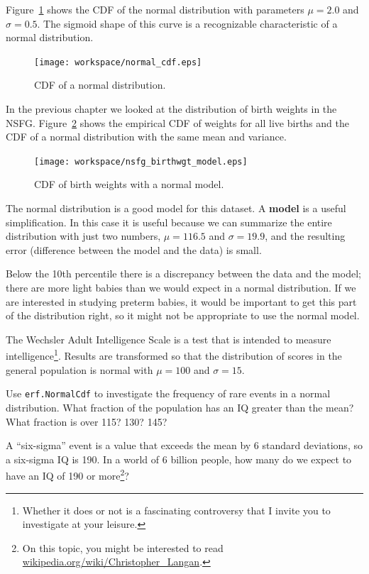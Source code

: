 \documentclass[12pt]{book}
\begin{document}
Figure~\ref{normal_cdf} shows the CDF of the normal distribution
with parameters $\mu=2.0$ and $\sigma=0.5$.  The sigmoid shape of
this curve is a recognizable characteristic of a normal distribution.

\begin{figure}
\centerline{\texttt{[image: workspace/normal\_cdf.eps]}}
\caption{CDF of a normal distribution.}
\label{normal_cdf}
\end{figure}

In the previous chapter we looked at the distribution of birth
weights in the NSFG.  Figure~\ref{nsfg_birthwgt_model} shows the
empirical CDF of weights for all live births and the CDF of
a normal distribution with the same mean and variance.


\begin{figure}
\centerline{\texttt{[image: workspace/nsfg\_birthwgt\_model.eps]}}
\caption{CDF of birth weights with a normal model.}
\label{nsfg_birthwgt_model}
\end{figure}

The normal distribution is a good model for this dataset.  A {\bf
  model} is a useful simplification.  In this case it is useful
because we can summarize the entire distribution with just two
numbers, $\mu=116.5$ and $\sigma=19.9$, and the resulting error
(difference between the model and the data) is small.


Below the 10th percentile there is a discrepancy between the data
and the model; there are more light babies than we would expect in
a normal distribution.  If we are interested in studying preterm
babies, it would be important to get this part of the distribution
right, so it might not be appropriate to use the normal
model.

\begin{ex}


The Wechsler Adult Intelligence Scale is a test that is intended
to measure intelligence\footnote{Whether it does or not is a
fascinating controversy that I invite you to investigate at your
leisure.}.  Results are transformed so that the distribution of scores
in the general population is normal with $\mu=100$ and $\sigma=15$.

Use {\tt erf.NormalCdf} to investigate the frequency of rare events in
a normal distribution.  What fraction of the population has an IQ
greater than the mean?  What fraction is over 115?  130?  145?

A ``six-sigma'' event is a value that exceeds the mean by 6 standard
deviations, so a six-sigma IQ is 190.  In a world of 6 billion people,
how many do we expect to have an IQ of 190 or more\footnote{On this
  topic, you might be interested to read
  \url{wikipedia.org/wiki/Christopher_Langan}.}?


\end{ex}
\end{document}
